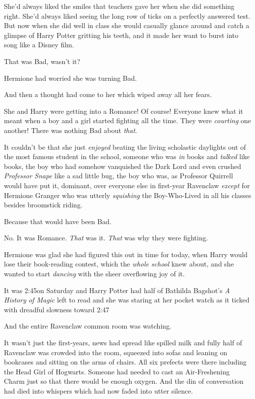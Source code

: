 She'd always liked the smiles that teachers gave her when she did something right. She'd always liked seeing the long row of ticks on a perfectly answered test. But now when she did well in class she would casually glance around and catch a glimpse of Harry Potter gritting his teeth, and it made her want to burst into song like a Disney film.

That was Bad, wasn't it?

Hermione had worried she was turning Bad.

And then a thought had come to her which wiped away all her fears.

She and Harry were getting into a Romance! Of course! Everyone knew what it meant when a boy and a girl started fighting all the time. They were \emph{courting} one another! There was nothing Bad about \emph{that}.

It couldn't be that she just \emph{enjoyed} beating the living scholastic daylights out of the most famous student in the school, someone who was \emph{in} books and \emph{talked} like books, the boy who had somehow vanquished the Dark Lord and even crushed \emph{Professor Snape} like a sad little bug, the boy who was, as Professor Quirrell would have put it, dominant, over everyone else in first-year Ravenclaw \emph{except} for Hermione Granger who was utterly \emph{squishing} the Boy-Who-Lived in all his classes besides broomstick riding.

Because that would have been Bad.

No. It was Romance. \emph{That} was it. \emph{That} was why they were fighting.

Hermione was glad she had figured this out in time for today, when Harry would lose their book-reading contest, which the \emph{whole school} knew about, and she wanted to start \emph{dancing} with the sheer overflowing joy of it.

It was 2:45\pm on Saturday and Harry Potter had half of Bathilda Bagshot's \emph{A History of Magic} left to read and she was staring at her pocket watch as it ticked with dreadful slowness toward 2:47\pm

And the entire Ravenclaw common room was watching.

It wasn't just the first-years, news had spread like spilled milk and fully half of Ravenclaw was crowded into the room, squeezed into sofas and leaning on bookcases and sitting on the arms of chairs. All six prefects were there including the Head Girl of Hogwarts. Someone had needed to cast an Air-Freshening Charm just so that there would be enough oxygen. And the din of conversation had died into whispers which had now faded into utter silence.

